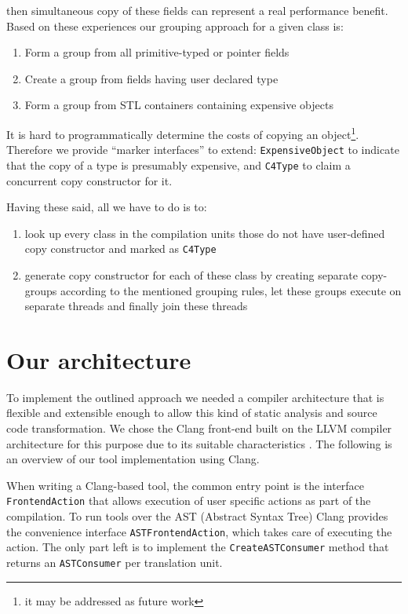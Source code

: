 \documentclass{article}
\begin{document}
then simultaneous copy of these fields can represent a real performance benefit. Based on these experiences our grouping approach for a given class is:
\begin{enumerate}
 \item Form a group from all primitive-typed or pointer fields
 \item Create a group from fields having user declared type
 \item Form a group from STL containers containing expensive objects
\end{enumerate}

It is hard to programmatically determine the costs of copying an object\footnote{it may be addressed as future work}. Therefore we provide ``marker interfaces'' to extend: \texttt{ExpensiveObject} to indicate that the copy of a type is presumably expensive, and \texttt{C4Type} to claim a concurrent copy constructor for it.

Having these said, all we have to do is to:
\begin{enumerate}
 \item look up every class in the compilation units those do not have user-defined copy constructor and marked as \texttt{C4Type}
 \item generate copy constructor for each of these class by creating separate copy-groups according to the mentioned grouping rules, let these groups execute on separate threads and finally join these threads
\end{enumerate}

\section{Our architecture}
\label{architecture}

To implement the outlined approach we needed a compiler architecture that is flexible and extensible enough to allow this kind of static analysis and source code transformation. We chose the Clang front-end built on the LLVM compiler architecture for this purpose due to its suitable characteristics \cite{lattner:clang}. The following is an overview of our tool implementation using Clang.

When writing a Clang-based tool, the common entry point is the interface \texttt{FrontendAction} that allows execution of user specific actions as part of the compilation. To run tools over the AST (Abstract Syntax Tree) Clang provides the convenience interface \texttt{ASTFrontendAction}, which takes care of executing the action. The only part left is to implement the \texttt{CreateASTConsumer} method that returns an \texttt{ASTConsumer} per translation unit.
\end{document}
